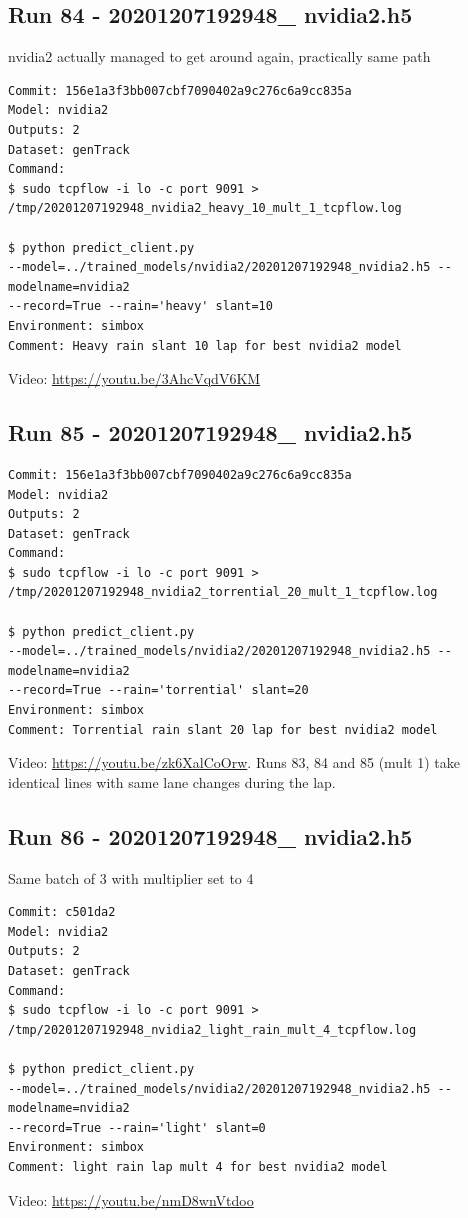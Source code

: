 \subsection{Run 84 - 20201207192948\_ nvidia2.h5 }
nvidia2 actually managed to get around again, practically same path
\label{app_res:84}
\begin{verbatim}
Commit: 156e1a3f3bb007cbf7090402a9c276c6a9cc835a
Model: nvidia2 
Outputs: 2
Dataset: genTrack
Command:
$ sudo tcpflow -i lo -c port 9091 > 
/tmp/20201207192948_nvidia2_heavy_10_mult_1_tcpflow.log

$ python predict_client.py
--model=../trained_models/nvidia2/20201207192948_nvidia2.h5 --modelname=nvidia2 
--record=True --rain='heavy' slant=10
Environment: simbox
Comment: Heavy rain slant 10 lap for best nvidia2 model
\end{verbatim}
Video: \url{https://youtu.be/3AhcVqdV6KM}

\subsection{Run 85 - 20201207192948\_ nvidia2.h5 }

\label{app_res:85}
\begin{verbatim}
Commit: 156e1a3f3bb007cbf7090402a9c276c6a9cc835a
Model: nvidia2 
Outputs: 2
Dataset: genTrack
Command:
$ sudo tcpflow -i lo -c port 9091 > 
/tmp/20201207192948_nvidia2_torrential_20_mult_1_tcpflow.log

$ python predict_client.py
--model=../trained_models/nvidia2/20201207192948_nvidia2.h5 --modelname=nvidia2 
--record=True --rain='torrential' slant=20
Environment: simbox
Comment: Torrential rain slant 20 lap for best nvidia2 model
\end{verbatim}
Video: \url{https://youtu.be/zk6XalCoOrw}. Runs 83, 84 and 85 (mult 1) take identical lines with same lane changes during the lap.

\subsection{Run 86 - 20201207192948\_ nvidia2.h5 }
Same batch of 3 with multiplier set to 4
\label{app_res:86}
\begin{verbatim}
Commit: c501da2
Model: nvidia2 
Outputs: 2
Dataset: genTrack
Command:
$ sudo tcpflow -i lo -c port 9091 > 
/tmp/20201207192948_nvidia2_light_rain_mult_4_tcpflow.log

$ python predict_client.py
--model=../trained_models/nvidia2/20201207192948_nvidia2.h5 --modelname=nvidia2 
--record=True --rain='light' slant=0
Environment: simbox
Comment: light rain lap mult 4 for best nvidia2 model
\end{verbatim}
Video: \url{https://youtu.be/nmD8wnVtdoo}

